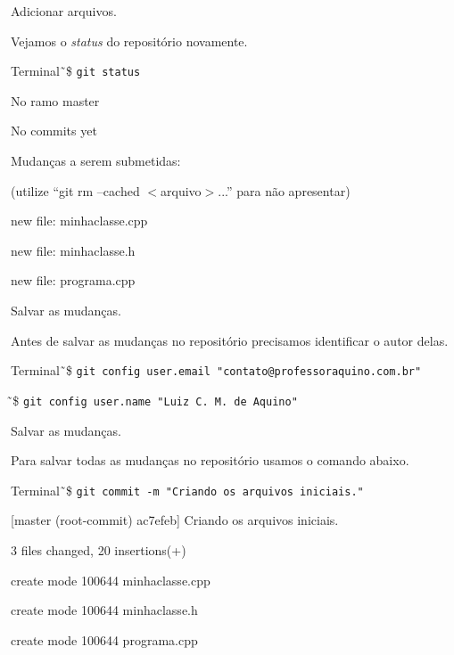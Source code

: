 \documentclass[brazil,aspectratio=169]{beamer}
\newcommand{\terminal}[1]{\textcolor{my-green}{\texttt{#1}}}
\begin{document}
\begin{frame}{Adicionar arquivos.}

  Vejamos o \textit{status} do repositório novamente.

  \begin{exampleblock}{Terminal}
    \~\,\$ \terminal{git status}

    No ramo master

    No commits yet

    Mudanças a serem submetidas:

    (utilize ``git rm --cached $<$arquivo$>$...'' para não apresentar)

    new file:   minhaclasse.cpp

    new file:   minhaclasse.h

    new file:   programa.cpp
  \end{exampleblock}

\end{frame}

\begin{frame}{Salvar as mudanças.}

  Antes de salvar as mudanças no repositório precisamos identificar o autor delas.

  \begin{exampleblock}{Terminal}
    \~\,\$ \terminal{git config user.email "contato@professoraquino.com.br"}

    \~\,\$ \terminal{git config user.name "Luiz C. M. de Aquino"}
  \end{exampleblock}

\end{frame}

\begin{frame}{Salvar as mudanças.}

  Para salvar todas as mudanças no repositório usamos o comando abaixo.

  \begin{exampleblock}{Terminal}
    \~\,\$ \terminal{git commit -m "Criando os arquivos iniciais."}

    [master (root-commit) ac7efeb] Criando os arquivos iniciais.

    3 files changed, 20 insertions(+)

    create mode 100644 minhaclasse.cpp

    create mode 100644 minhaclasse.h

    create mode 100644 programa.cpp
 
  \end{exampleblock}
  
\end{frame}
\end{document}
